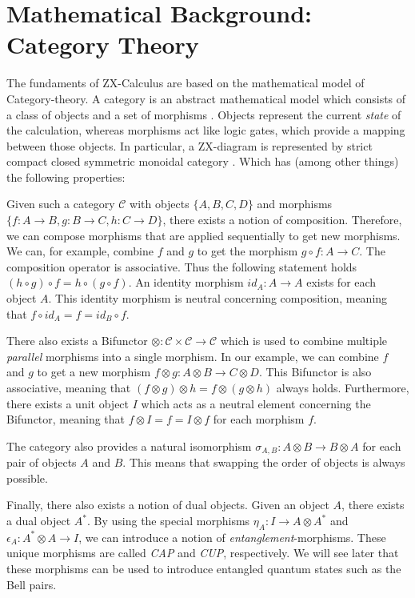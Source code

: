 \section{Mathematical Background: Category Theory}

The fundaments of ZX-Calculus are based on the mathematical model of Category-theory. A category is an abstract mathematical model which consists of a class of objects and a set of morphisms \cite{quanlong2023completness}. Objects represent the current \textit{state} of the calculation, whereas morphisms act like logic gates, which provide a mapping between those objects. In particular, a ZX-diagram is represented by strict compact closed symmetric monoidal category \cite{emmanueljeandel2020zx}. Which has (among other things) the following properties:

Given such a category $\mathcal{C}$ with objects $\{A, B, C, D\}$ and morphisms $\{f: A \rightarrow B, g: B \rightarrow C, h: C \rightarrow D\}$, there exists a notion of composition\label{sequential-composition}. Therefore, we can compose morphisms that are applied sequentially to get new morphisms. We can, for example, combine $f$ and $g$ to get the morphism $g \circ f: A \rightarrow C$. The composition operator is associative. Thus the following statement holds $(h \circ g) \circ f = h \circ (g \circ f)$. An identity morphism $id_A: A \rightarrow A$ exists for each object $A$. This identity morphism is neutral concerning composition, meaning that $f \circ id_A = f = id_B \circ f$.

There also exists a Bifunctor $\otimes:\mathcal{C}\times\mathcal{C}\rightarrow\mathcal{C}$ which is used to combine multiple \textit{parallel} morphisms into a single morphism\label{parallel-composition}. In our example, we can combine $f$ and $g$ to get a new morphism $f \otimes g: A \otimes B \rightarrow C \otimes D$. This Bifunctor is also associative, meaning that $(f \otimes g) \otimes h = f \otimes (g \otimes h)$ always holds. Furthermore, there exists a unit object $I$ which acts as a neutral element concerning the Bifunctor, meaning that $f \otimes I = f = I \otimes f$ for each morphism $f$.

The category also provides a natural isomorphism $\sigma_{A, B}: A \otimes B \rightarrow B \otimes A$ for each pair of objects $A$ and $B$. This means that swapping the order of objects is always possible.

Finally, there also exists a notion of dual objects. Given an object $A$, there exists a dual object $A^*$. By using the special morphisms $\eta_A: I \rightarrow A \otimes A^*$ and $\epsilon_A: A^* \otimes A \rightarrow I$, we can introduce a notion of \textit{entanglement}-morphisms. These unique morphisms are called \textit{CAP} and \textit{CUP}, respectively. We will see later that these morphisms can be used to introduce entangled quantum states such as the Bell pairs.

